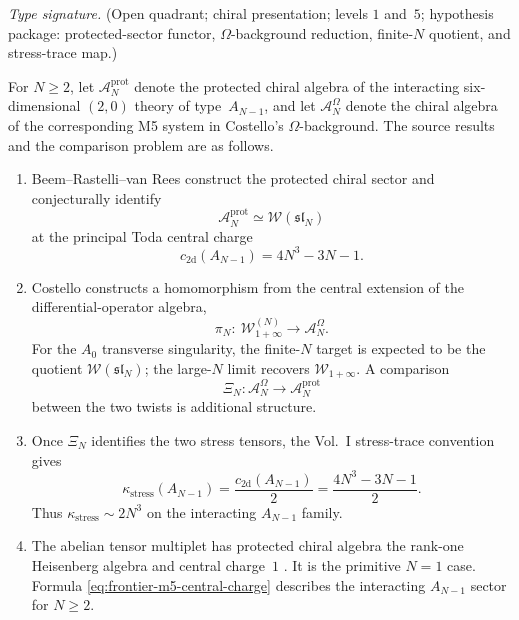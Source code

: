 \begin{theorem}
\label{thm:frontier-m5}
\emph{Type signature.}
(Open quadrant; chiral presentation; levels $1$ and~$5$; hypothesis
package: protected-sector functor, $\Omega$-background reduction,
finite-$N$ quotient, and stress-trace map.)

For $N\geq2$, let $\mathcal A_N^{\mathrm{prot}}$ denote the protected
chiral algebra of the interacting six-dimensional $(2,0)$ theory of
type~$A_{N-1}$, and let $\mathcal A_N^\Omega$ denote the chiral algebra
of the corresponding M5 system in Costello's $\Omega$-background.
The source results and the comparison problem are as follows.
\begin{enumerate}[label=\textup{(\roman*)}]
\item Beem--Rastelli--van Rees construct the protected chiral sector
and conjecturally identify
\[
 \mathcal A_N^{\mathrm{prot}}\simeq
 \mathcal W(\mathfrak{sl}_N)
\]
at the principal Toda central charge
\begin{equation}\label{eq:frontier-m5-central-charge}
 c_{2\mathrm d}(A_{N-1})=4N^3-3N-1.
\end{equation}

\item Costello constructs a homomorphism from the central extension of
the differential-operator algebra,
\[
 \pi_N:\ \mathcal W_{1+\infty}^{(N)}
 \longrightarrow \mathcal A_N^\Omega .
\]
For the $A_0$ transverse singularity, the finite-$N$ target is expected
to be the quotient $\mathcal W(\mathfrak{sl}_N)$; the large-$N$ limit
recovers $\mathcal W_{1+\infty}$.  A comparison
\[
 \Xi_N:\mathcal A_N^\Omega\longrightarrow
       \mathcal A_N^{\mathrm{prot}}
\]
between the two twists is additional structure.

\item Once $\Xi_N$ identifies the two stress tensors, the Vol.~I
stress-trace convention gives
\begin{equation}\label{eq:frontier-m5-kappa}
 \kappa_{\mathrm{stress}}(A_{N-1})
 =\frac{c_{2\mathrm d}(A_{N-1})}{2}
 =\frac{4N^3-3N-1}{2}.
\end{equation}
Thus $\kappa_{\mathrm{stress}}\sim2N^3$ on the interacting
$A_{N-1}$ family.

\item The abelian tensor multiplet has protected chiral algebra the
rank-one Heisenberg algebra and central charge~$1$
\cite[\S3]{BRvR14-6d}.  It is the primitive $N=1$ case.  Formula
\eqref{eq:frontier-m5-central-charge} describes the interacting
$A_{N-1}$ sector for $N\geq2$.


\end{enumerate}
\end{theorem}
